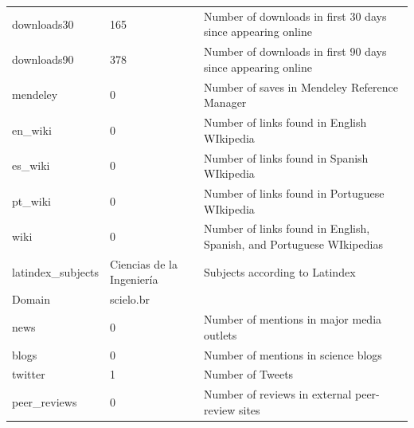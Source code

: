\begin{longtable}{@{}lp{5cm}p{6cm}@{}}
downloads30        & 165                                                                              & Number of downloads in first 30 days since appearing online          \\
downloads90        & 378                                                                              & Number of downloads in first 90 days since appearing online          \\
mendeley           & 0                                                                                & Number of saves in Mendeley Reference Manager                        \\
en\_wiki           & 0                                                                                & Number of links found in English WIkipedia                           \\
es\_wiki           & 0                                                                                & Number of links found in Spanish WIkipedia                           \\
pt\_wiki           & 0                                                                                & Number of links found in Portuguese WIkipedia                        \\
wiki               & 0                                                                                & Number of links found in English, Spanish, and Portuguese WIkipedias \\
latindex\_subjects & Ciencias de la Ingeniería                                                       & Subjects according to Latindex                                       \\
Domain             & scielo.br                                                                        &                                                                      \\
news               & 0                                                                                & Number of mentions in major media outlets                            \\
blogs              & 0                                                                                & Number of mentions in science blogs                                  \\
twitter            & 1                                                                                & Number of Tweets                                                     \\
peer\_reviews      & 0                                                                                & Number of reviews  in external peer-review sites                     \\

\end{longtable}
